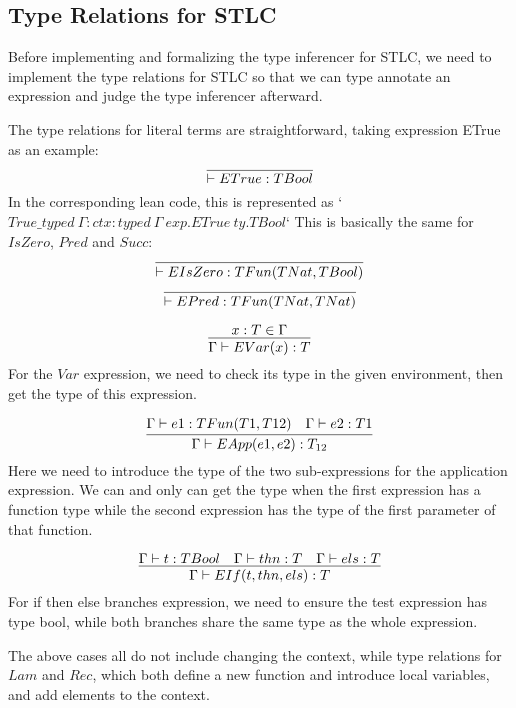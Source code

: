 \documentclass[conference]{IEEEtran}
\begin{document}
\subsection{Type Relations for STLC}
Before implementing and formalizing the type inferencer for STLC,
we need to implement the type relations for STLC so that we can
type annotate an expression and judge the type inferencer afterward.

The type relations for literal terms are straightforward, taking
expression ETrue as an example:
\begin{equation}
	\infer{\vdash ETrue:TBool}{}
	\label{eq:TITrue}
\end{equation}
In the corresponding lean code, this is represented as
`$True\_typed\ {\Gamma : ctx} : typed\ \Gamma\ exp.ETrue\ ty.TBool$`
This is basically the same for $IsZero$, $Pred$ and $Succ$:
\begin{equation}
	\infer{\vdash EIsZero:TFun(TNat, TBool)}{}
	\label{eq:TIIsZero}
\end{equation}
\begin{equation}
	\infer{\vdash EPred:TFun(TNat, TNat)}{}
	\label{eq:TIPred}
\end{equation}

\begin{equation}
	\infer{\Gamma\vdash EVar(x):T}{x:T\in \Gamma}
	\label{eq:TIVar}
\end{equation}
For the $Var$ expression, we need to check its type in the given environment,
then get the type of this expression.

\begin{equation}
	\infer{\Gamma\vdash EApp(e1, e2):T_{12}}
	{\Gamma\vdash e1:TFun(T1, T12) & \Gamma\vdash e2:T1}
	\label{eq:TIApp}
\end{equation}
Here we need to introduce the type of the two sub-expressions for
the application expression. We can and only can get the type
when the first expression has a function type while the second expression
has the type of the first parameter of that function.

\begin{equation}
	\infer{\Gamma\vdash EIf(t, thn, els):T}
	{\Gamma\vdash t:TBool & \Gamma\vdash thn:T & \Gamma\vdash els:T}
	\label{eq:TIIf}
\end{equation}
For if then else branches expression, we need to ensure the test expression has type bool,
while both branches share the same type as the whole expression.

The above cases all do not include changing the context, while type
relations for $Lam$ and $Rec$, which both define a new function and
introduce local variables, and add elements to the context.
\end{document}
